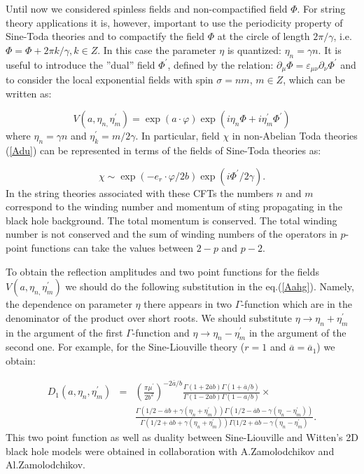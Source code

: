 \documentclass[a4paper,12pt]{article}
\begin{document}
Until now we considered spinless fields and non-compactified field $\Phi $.
For string theory applications it is, however, important to use the
periodicity property of Sine-Toda theories and to compactify the field $\Phi 
$ at the circle of length $2\pi /\gamma $, i.e. $\Phi =\Phi +2\pi k/\gamma
,k\in Z$. In this case the parameter $\eta $ is quantized: $\eta _n=\gamma n$. 
It is useful to introduce the ''dual'' field $\Phi ^{\prime }$, defined by
the relation: $\partial _\mu \Phi =\varepsilon _{\mu \nu}\partial_\nu \Phi
^{\prime }$ and to consider the local exponential fields with spin 
$\sigma =nm$, $m\in Z$, which can be written as:

\begin{equation}
V(a,\eta _{n,}\eta _m^{\prime })=\exp (a\cdot \varphi )\exp (i\eta _n\Phi
+i\eta _m^{\prime }\Phi ^{\prime })  \label{Sfiel}
\end{equation}
where $\eta _n=\gamma n$ and $\eta _k^{\prime }=m/2\gamma $. In particular,
field $\chi $ in non-Abelian Toda theories (\ref{Adu}) can be represented in
terms of the fields of Sine-Toda theories as:

\begin{equation}
\chi \sim \exp (-e_r\cdot \varphi /2b)\exp (i\Phi ^{\prime }/2\gamma ).
\label{Qhi}
\end{equation}
In the string theories associated with these CFTs the numbers $n$ and $m$
correspond to the winding number and momentum of sting propagating in the
black hole background. The total momentum is conserved. The total winding 
number is not conserved and the sum of winding numbers of the operators in 
$p$-point functions can take the values between $2-p$ and $p-2$. 

To obtain the reflection amplitudes and two point
functions for the fields $V(a,\eta _{n,}\eta _m^{\prime })$ we should do the
following substitution in the eq.(\ref{Aahg}). Namely,  
the dependence on parameter 
$\eta $ there appears in two $\Gamma $-function which are in the denominator
of the product over short roots. We should substitute $\eta \rightarrow \eta
_n+\eta _m^{\prime}$ in the argument of the first $\Gamma $-function and $\eta
\rightarrow \eta _n-\eta _m^{\prime}$ in the argument of the second one.  
For example,
for the Sine-Liouville theory ($r=1$ and $\overline{a}=\overline{a}_1$) we
obtain:

\begin{eqnarray}
D_1(a,\eta _n,\eta _m^{\prime}) &=&\left( \frac{\pi \mu ^{\prime }}{2b^2}\right)^{-2\overline{a}/b}\frac{\Gamma (1+2\overline{a}b)\Gamma (1+\overline{a}/b)}
{\Gamma (1-2\overline{a}b)\Gamma (1-\overline{a}/b)}\times  \label{TPfn} \\
&&\frac{\Gamma (1/2-\overline{a}b+\gamma (\eta _n+\eta _m^{\prime}))
\Gamma (1/2-\overline{a}b-\gamma (\eta _n-\eta _m^{\prime}))}
{\Gamma (1/2+\overline{a}b+\gamma
(\eta _n+\eta _m^{\prime}))
\Gamma (1/2+\overline{a}b-\gamma (\eta _n-\eta _m^{\prime})}. 
\nonumber
\end{eqnarray}
This two point function as well as duality between Sine-Liouville and
Witten's 2D black hole models were obtained in collaboration with
A.Zamolodchikov and Al.Zamolodchikov.
\end{document}
